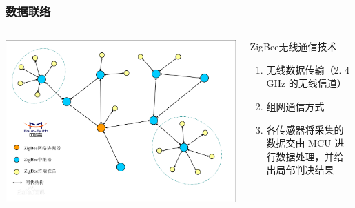 ﻿\documentclass{beamer}
\begin{document}
\begin{frame}
\frametitle{数据联络}
\begin{columns}
\begin{column}{0.50\textwidth}
\includegraphics[width=\textwidth]{./img/z}
\end{column}
\begin{column}{0.50\textwidth}
\begin{block}{ZigBee无线通信技术}
\begin{enumerate}
\item 无线数据传输（2. 4 GHz 的无线信道）
\item 组网通信方式
\item 各传感器将采集的数据交由 MCU 进行数据处理，并给出局部判决结果
\end{enumerate}
\end{block}
\end{column}
\end{columns}
\end{frame}
\end{document}
